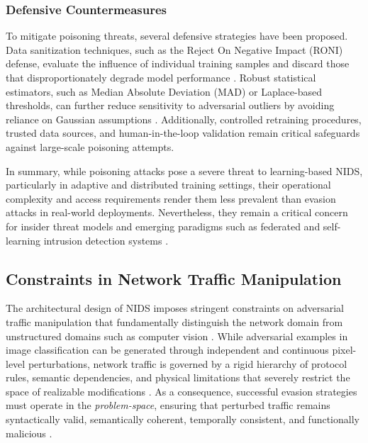 \subsubsection{Defensive Countermeasures}

To mitigate poisoning threats, several defensive strategies have been proposed. 
Data sanitization techniques, such as the Reject On Negative Impact (RONI) defense, evaluate the influence of individual training samples and discard those that disproportionately degrade model performance \cite{huang2011adversarial}. 
Robust statistical estimators, such as Median Absolute Deviation (MAD) or Laplace-based thresholds, can further reduce sensitivity to adversarial outliers by avoiding reliance on Gaussian assumptions \cite{rubinstein2009antidote}. 
Additionally, controlled retraining procedures, trusted data sources, and human-in-the-loop validation remain critical safeguards against large-scale poisoning attempts.

In summary, while poisoning attacks pose a severe threat to learning-based NIDS, particularly in adaptive and distributed training settings, their operational complexity and access requirements render them less prevalent than evasion attacks in real-world deployments. 
Nevertheless, they remain a critical concern for insider threat models and emerging paradigms such as federated and self-learning intrusion detection systems \cite{abomakhelb2025comprehensive}.

\subsection{Constraints in Network Traffic Manipulation}

The architectural design of NIDS imposes stringent constraints on adversarial traffic manipulation that fundamentally distinguish the network domain from unstructured domains such as computer vision \cite{han2021evaluating}. 
While adversarial examples in image classification can be generated through independent and continuous pixel-level perturbations, network traffic is governed by a rigid hierarchy of protocol rules, semantic dependencies, and physical limitations that severely restrict the space of realizable modifications \cite{wang2024progen, li2020adversarial}. 
As a consequence, successful evasion strategies must operate in the \emph{problem-space}, ensuring that perturbed traffic remains syntactically valid, semantically coherent, temporally consistent, and functionally malicious \cite{merzouk2022investigating}.

